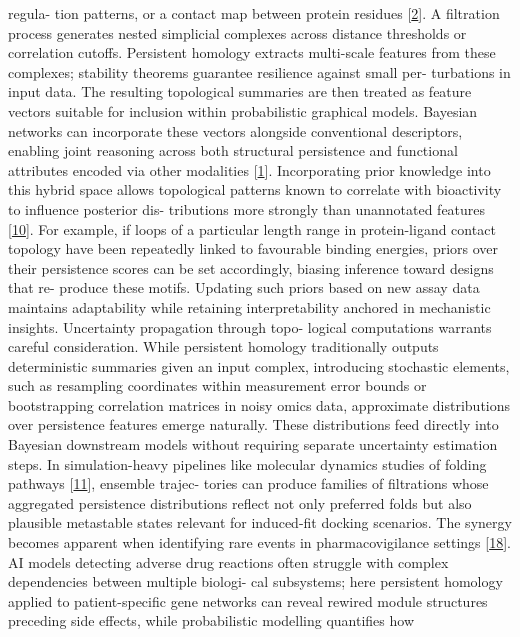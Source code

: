 \documentclass[
]{article}
\begin{document}
regula- tion patterns, or a contact map between protein residues
{[}\hyperref[_bookmark42]{2}{]}. A filtration process generates nested
simplicial complexes across distance thresholds or correlation cutoffs.
Persistent homology extracts multi-scale features from these complexes;
stability theorems guarantee resilience against small per- turbations in
input data. The resulting topological summaries are then treated as
feature vectors suitable for inclusion within probabilistic graphical
models. Bayesian networks can incorporate these vectors alongside
conventional descriptors, enabling joint reasoning across both
structural persistence and functional attributes encoded via other
modalities {[}\hyperref[_bookmark41]{1}{]}. Incorporating prior
knowledge into this hybrid space allows topological patterns known to
correlate with bioactivity to influence posterior dis- tributions more
strongly than unannotated features {[}\hyperref[_bookmark50]{10}{]}. For
example, if loops of a particular length range in protein-ligand contact
topology have been repeatedly linked to favourable binding energies,
priors over their persistence scores can be set accordingly, biasing
inference toward designs that re- produce these motifs. Updating such
priors based on new assay data maintains adaptability while retaining
interpretability anchored in mechanistic insights. Uncertainty
propagation through topo- logical computations warrants careful
consideration. While persistent homology traditionally outputs
deterministic summaries given an input complex, introducing stochastic
elements, such as resampling coordinates within measurement error bounds
or bootstrapping correlation matrices in noisy omics data, approximate
distributions over persistence features emerge naturally. These
distributions feed directly into Bayesian downstream models without
requiring separate uncertainty estimation steps. In simulation-heavy
pipelines like molecular dynamics studies of folding pathways
{[}\hyperref[_bookmark51]{11}{]}, ensemble trajec- tories can produce
families of filtrations whose aggregated persistence distributions
reflect not only preferred folds but also plausible metastable states
relevant for induced-fit docking scenarios. The synergy becomes apparent
when identifying rare events in pharmacovigilance settings
{[}\hyperref[_bookmark58]{18}{]}. AI models detecting adverse drug
reactions often struggle with complex dependencies between multiple
biologi- cal subsystems; here persistent homology applied to
patient-specific gene networks can reveal rewired module structures
preceding side effects, while probabilistic modelling quantifies how
\end{document}
